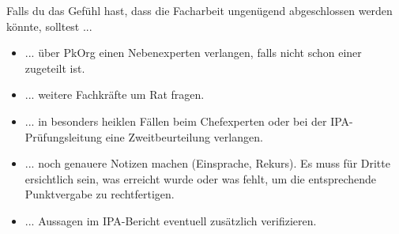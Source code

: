 Falls du das Gefühl hast, dass die Facharbeit ungenügend abgeschlossen werden könnte, solltest ...
\begin{itemize}
  \item ... über PkOrg einen Nebenexperten verlangen, falls nicht schon einer zugeteilt ist.
  \item ... weitere Fachkräfte um Rat fragen.
  \item ... in besonders heiklen Fällen beim Chefexperten oder bei der IPA-Prüfungsleitung eine Zweitbeurteilung verlangen.
  \item ... noch genauere Notizen machen (Einsprache, Rekurs). Es muss für Dritte ersichtlich sein, was erreicht wurde oder was fehlt, um die entsprechende Punktvergabe zu rechtfertigen.
  \item ... Aussagen im IPA-Bericht eventuell zusätzlich verifizieren.
\end{itemize}